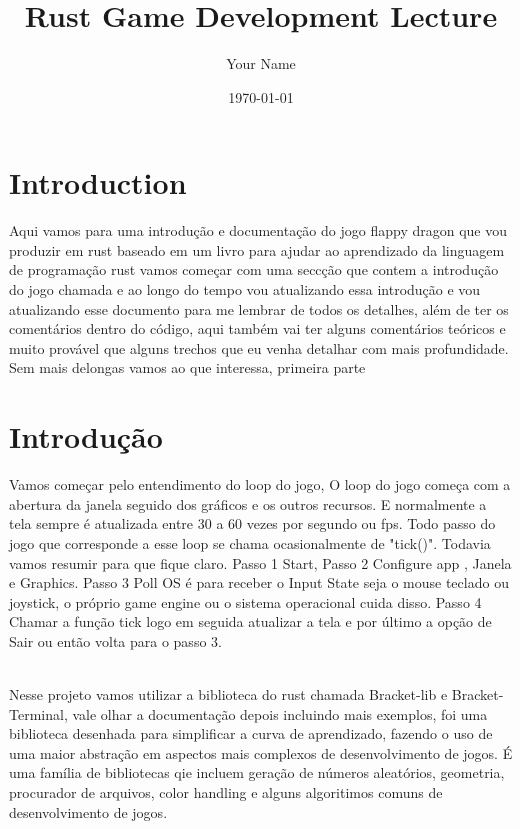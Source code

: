 \documentclass{article}
\title{Rust Game Development Lecture}
\author{Your Name}
\date{\today}
\begin{document}
\maketitle

\section{Introduction}
Aqui vamos para uma introdução e documentação do jogo flappy dragon que vou produzir em rust baseado em um livro para ajudar ao aprendizado da linguagem de programação rust vamos começar com uma seccção que contem a introdução do jogo chamada e ao longo do tempo vou atualizando essa introdução e vou atualizando esse documento para me lembrar de todos os detalhes, além de ter os comentários dentro do código, aqui também vai ter alguns comentários teóricos e muito provável que alguns trechos que eu venha detalhar com mais profundidade. Sem mais delongas vamos ao que interessa, primeira parte 
\vspace{0.3cm}

\section{Introdução}
Vamos começar pelo entendimento do loop do jogo, O loop do jogo começa com a abertura da janela seguido dos gráficos e os outros recursos. E normalmente a tela sempre é atualizada entre 30 a 60 vezes por segundo ou fps. Todo passo do jogo que corresponde a esse loop se chama ocasionalmente de "tick()". Todavia vamos resumir para que fique claro. Passo 1 Start, Passo 2 Configure app , Janela e Graphics. Passo 3 Poll OS é para receber o Input State seja o mouse teclado ou joystick, o próprio game engine ou o sistema operacional cuida disso. Passo 4 Chamar a função tick logo em seguida atualizar a tela e por último a opção de Sair ou então volta para o passo 3. 

\\

\vspace{0.2cm}
Nesse projeto vamos utilizar a biblioteca do rust chamada Bracket-lib e Bracket-Terminal, vale olhar a documentação depois incluindo mais exemplos, foi uma biblioteca desenhada para simplificar a curva de aprendizado, fazendo o uso de uma maior abstração em aspectos mais complexos de desenvolvimento de jogos. É uma família de bibliotecas qie incluem geração de números aleatórios, geometria, procurador de arquivos, color handling e alguns algoritimos comuns de desenvolvimento de jogos. 
\end{document}
